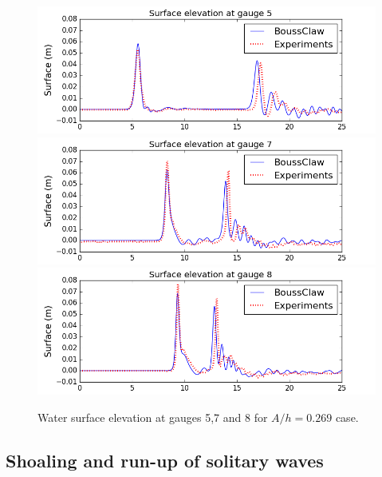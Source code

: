 \documentclass[review]{elsarticle}
\begin{document}
\begin{figure}[!htb]
\centering
\includegraphics[width=.8\textwidth]{_fig/gauge0005fig300.png}\\
\includegraphics[width=.8\textwidth]{_fig/gauge0007fig300.png}\\
\includegraphics[width=.8\textwidth]{_fig/gauge0008fig300.png}
\caption{Water surface elevation at gauges 5,7 and 8 for $A/h=0.269$ case.}
\label{fig:bp5b_gauges}
\end{figure}


\subsection{Shoaling and run-up of solitary waves}
\label{sec:shoaling_runup}
\end{document}
